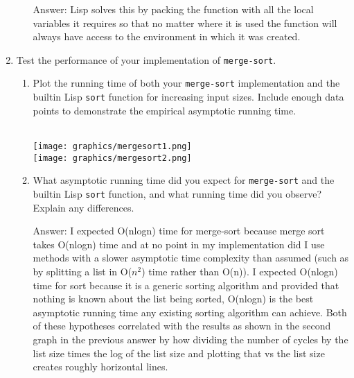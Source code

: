 \documentclass[12pt,letterpaper]{ntdhw}
\begin{document}
\begin{enumerate}
\begin{enumerate}
    \begin{emph}
      Answer: Lisp solves this by packing the function with all the local variables it requires so that no matter where it is used the function will always have access to the environment in which it was created.
    \end{emph}

  \end{enumerate}

  \item Test the performance of your implementation of
    \texttt{merge-sort}.
    \begin{enumerate}

    \item Plot the running time of both your \texttt{merge-sort}
      implementation and the builtin Lisp \texttt{sort} function for
      increasing input sizes.  Include enough data points to
      demonstrate the empirical asymptotic running time.

    \begin{emph}
      \\
      \texttt{[image: graphics/mergesort1.png]} 
      \\
      \texttt{[image: graphics/mergesort2.png]}
    \end{emph}

  \item What asymptotic running time did you expect for
    \texttt{merge-sort} and the builtin Lisp \texttt{sort} function, and
    what running time did you observe?  Explain any differences.

    \begin{emph}
      Answer: I expected O(nlogn) time for merge-sort because merge sort takes O(nlogn) time and at no point in my implementation did I use methods with a slower asymptotic time complexity than assumed (such as by splitting a list in O($n^2$) time rather than O(n)). I expected O(nlogn) time for sort because it is a generic sorting algorithm and provided that nothing is known about the list being sorted, O(nlogn) is the best asymptotic running time any existing sorting algorithm can achieve. Both of these hypotheses correlated with the results as shown in the second graph in the previous answer by how dividing the number of cycles by the list size times the log of the list size and plotting that vs the list size creates roughly horizontal lines.
    \end{emph}

    \end{enumerate}


\end{enumerate}
\end{document}
